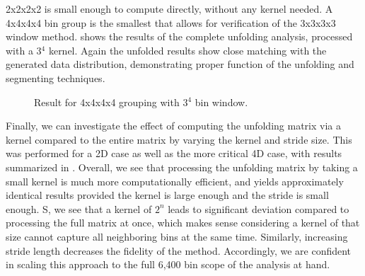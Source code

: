         2x2x2x2 is small enough to compute directly, without any kernel needed. A 4x4x4x4 bin group is the smallest that allows for verification of the 3x3x3x3 window method.  shows the results of the complete unfolding analysis, processed with a 3$^4$ kernel. Again the unfolded results show close matching with the generated data distribution, demonstrating proper function of the unfolding and segmenting techniques.
    
        \begin{figure}[H]
            \centering
            \hfill
            \caption[4x4x4x4 IBU Result]{ Result for 4x4x4x4 grouping with 3$^4$ bin window.}\label{fig:4x4unfold}
        \end{figure}

        Finally, we can investigate the effect of computing the unfolding matrix via a kernel compared to the entire matrix by varying the kernel and stride size. This was performed for a 2D case as well as the more critical 4D case, with results summarized in . Overall, we see that processing the unfolding matrix by taking a small kernel is much more computationally efficient, and yields approximately identical results provided the kernel is large enough and the stride is small enough. S, we see that a kernel of $2^n$ leads to significant deviation compared to processing the full matrix at once, which makes sense considering a kernel of that size cannot capture all neighboring bins at the same time. Similarly, increasing stride length decreases the fidelity of the method. Accordingly, we are confident in scaling this approach to the full 6,400 bin scope of the analysis at hand. 
    
